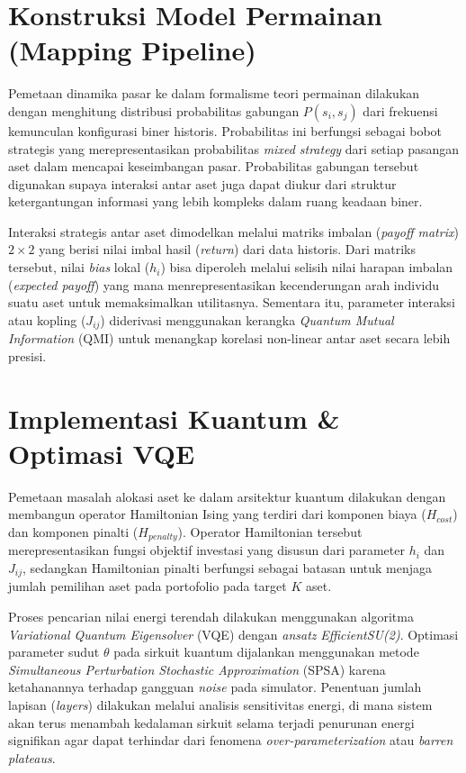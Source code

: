 \section{Konstruksi Model Permainan (Mapping Pipeline)}
Pemetaan dinamika pasar ke dalam formalisme teori permainan dilakukan dengan menghitung distribusi probabilitas gabungan $P(s_i, s_j)$ dari frekuensi kemunculan konfigurasi biner historis. Probabilitas ini berfungsi sebagai bobot strategis yang merepresentasikan probabilitas \textit{mixed strategy} dari setiap pasangan aset dalam mencapai keseimbangan pasar. Probabilitas gabungan tersebut digunakan supaya interaksi antar aset juga dapat diukur dari struktur ketergantungan informasi yang lebih kompleks dalam ruang keadaan biner. 

Interaksi strategis antar aset dimodelkan melalui matriks imbalan (\textit{payoff matrix}) $2 \times 2$ yang berisi nilai imbal hasil (\textit{return}) dari data historis. Dari matriks tersebut, nilai \textit{bias} lokal ($h_i$) bisa diperoleh melalui selisih nilai harapan imbalan (\textit{expected payoff}) yang mana menrepresentasikan kecenderungan arah individu suatu aset untuk memaksimalkan utilitasnya. Sementara itu, parameter interaksi atau kopling ($J_{ij}$) diderivasi menggunakan kerangka \textit{Quantum Mutual Information} (QMI) untuk menangkap korelasi non-linear antar aset secara lebih presisi.

\section{Implementasi Kuantum \& Optimasi VQE}
Pemetaan masalah alokasi aset ke dalam arsitektur kuantum dilakukan dengan membangun operator Hamiltonian Ising yang terdiri dari komponen biaya ($H_{cost}$) dan komponen pinalti ($H_{penalty}$). Operator Hamiltonian tersebut merepresentasikan fungsi objektif investasi yang disusun dari parameter $h_i$ dan $J_{ij}$, sedangkan Hamiltonian pinalti berfungsi sebagai batasan untuk menjaga jumlah pemilihan aset pada portofolio pada target $K$ aset.

Proses pencarian nilai energi terendah dilakukan menggunakan algoritma \textit{Variational Quantum Eigensolver} (VQE) dengan \textit{ansatz} \textit{EfficientSU(2)}. Optimasi parameter sudut $\theta$ pada sirkuit kuantum dijalankan menggunakan metode \textit{Simultaneous Perturbation Stochastic Approximation} (SPSA) karena ketahanannya terhadap gangguan \textit{noise} pada simulator. Penentuan jumlah lapisan (\textit{layers}) dilakukan melalui analisis sensitivitas energi, di mana sistem akan terus menambah kedalaman sirkuit selama terjadi penurunan energi signifikan agar dapat terhindar dari fenomena \textit{over-parameterization} atau \textit{barren plateaus}.

